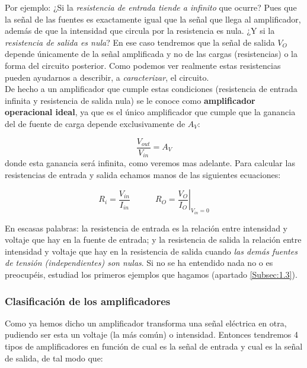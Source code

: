 \documentclass[11pt]{article} %
\newcommand{\tquad}{\quad \quad \quad}
\begin{document}
Por ejemplo: ¿Si la \textit{resistencia de entrada tiende a infinito} que ocurre? Pues que la señal de las fuentes es exactamente igual que la señal que llega al amplificador, además de que la intensidad que circula por la resistencia es nula. ¿Y si la \textit{resistencia de salida es nula}? En ese caso tendremos que la señal de salida $V_O$ depende únicamente de la señal amplificada y no de las cargas (resistencias) o la forma del circuito posterior. Como podemos ver realmente estas resistencias pueden ayudarnos a describir, a \textit{caracterizar}, el circuito. \\

De hecho a un amplificador que cumple estas condiciones (resistencia de entrada infinita y resistencia de salida nula) se le conoce como \textbf{amplificador operacional ideal}, ya que es el único amplificador que cumple que la ganancia del de fuente de carga depende exclusivamente de $A_V$: 

\begin{equation}
\dfrac{V_{out}}{V_{in}} = A_V
\end{equation}
donde esta ganancia será infinita, como veremos mas adelante. Para calcular las resistencias de entrada y salida echamos manos de las siguientes ecuaciones:

\begin{equation}
R_i = \dfrac{V_{in}}{I_{in}} \tquad R_O = \left. \dfrac{V_O}{I_O} \right|_{V_{in}=0}
\end{equation}

En escasas palabras: la resistencia de entrada es la relación entre intensidad y voltaje que hay en la fuente de entrada; y la resistencia de salida la relación entre intensidad y voltaje que hay en la resistencia de salida cuando \textit{las demás fuentes de tensión (independientes) son nulas}. Si no se ha entendido nada no o es preocupéis, estudiad los primeros ejemplos que hagamos (apartado \ref{Subsec:1.3}).



\subsubsection{Clasificación de los amplificadores}

Como ya hemos dicho un amplificador transforma una señal eléctrica en otra, pudiendo ser esta un voltaje (la más común) o intensidad. Entonces tendremos 4 tipos de amplificadores en función de cual es la señal de entrada y cual es la señal de salida, de tal modo que:
\end{document}
